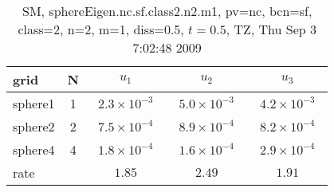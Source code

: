 \begin{table}[hbt]\tableFont %
\begin{center}
\begin{tabular}{|l|c|c|c|c|} \hline 
grid  & N &  $u_1$ & $u_2$ & $u_3$  \\ \hline 
             sphere1 &     1 & ~$2.3\times10^{ -3}$~ & ~$5.0\times10^{ -3}$~ & ~$4.2\times10^{ -3}$~  \\ \hline
             sphere2 &     2 & ~$7.5\times10^{ -4}$~ & ~$8.9\times10^{ -4}$~ & ~$8.2\times10^{ -4}$~  \\ \hline
             sphere4 &     4 & ~$1.8\times10^{ -4}$~ & ~$1.6\times10^{ -4}$~ & ~$2.9\times10^{ -4}$~  \\ \hline
    rate             &       &       $1.85$          &       $2.49$          &       $1.91$           \\ \hline
\end{tabular}
\caption{SM, sphereEigen.nc.sf.class2.n2.m1, pv=nc, bcn=sf, class=2, n=2, m=1, diss=0.5, $t=0.5$,  TZ, Thu Sep  3  7:02:48 2009}\label{table:sphereEigen.nc.sf.class2.n2.m1}
\end{center}
\end{table}
